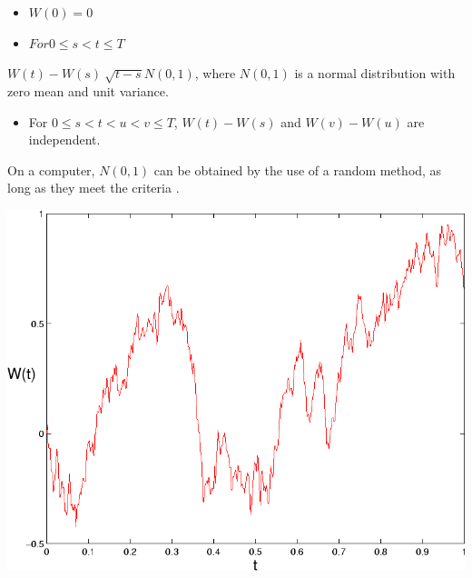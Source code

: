 \documentclass[10pt]{report}
\begin{document}
		\begin{itemize}
			\item \(W(0) = 0\)
			\item \(For 0 \leq s < t \leq T\) 
		\end{itemize}
		
		\(W(t) - W(s) ~ \sqrt{t - s} N(0,1)\), where \(N(0,1)\) is a normal distribution with zero mean and unit variance. 
		
		\begin{itemize}
			\item For \( 0 \leq s < t < u < v \leq T\), \(W(t) - W(s)\) and \(W(v) - W(u)\) are independent.
		\end{itemize}
	
		On a computer, \(N(0,1)\) can be obtained by the use of a random method, as long as they meet the criteria \cite{wiener-process}. 
		
		\begin{minipage}{\textwidth}
			\centering
			\includegraphics[scale=.3]{wiener-process}
			\label{fig:wiener-proc}
		\end{minipage} 
		
\end{document}
